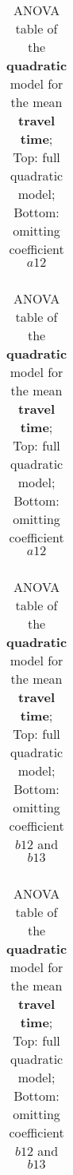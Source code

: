 \begin{table}[h!]
	\centering
	\begin{tabular}{l r r r r r}
	
	\end{tabular}

	\bigskip

	\begin{tabular}{l r r r r r}
		
	\end{tabular}
	\caption{ANOVA table of the \textbf{quadratic} model for the mean \textbf{travel time}; Top: full quadratic model; Bottom: omitting coefficient $a12$}\label{tbl:anova_quadratic_time}
\end{table}

\begin{table}[h!]
	\centering
	\begin{tabular}{l r r r r r}
	
	\end{tabular}

	\bigskip

	\begin{tabular}{l r r r r r}
		
	\end{tabular}
	
	\caption{ANOVA table of the \textbf{quadratic} model for the mean \textbf{travel time}; Top: full quadratic model; Bottom: omitting coefficient $b12$ and $b13$}\label{tbl:anova_quadratic_jerk}
\end{table}